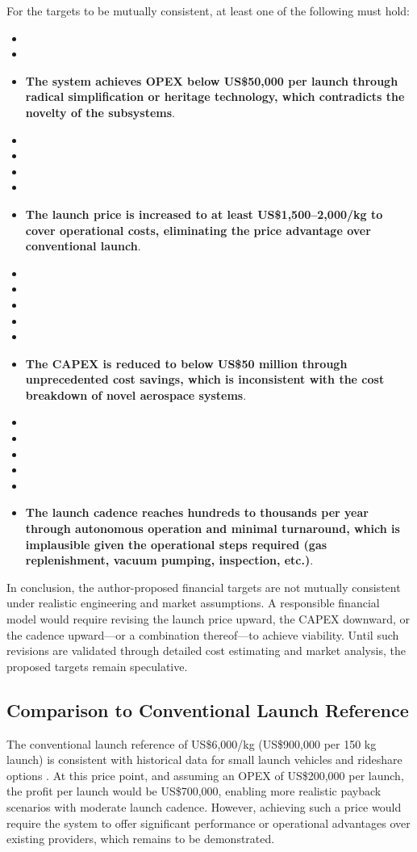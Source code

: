 For the targets to be mutually consistent, at least one of the following must hold:
\begin{itemize}
    \item \item \item \textbf{The system achieves OPEX below US\$50,000 per launch through radical simplification or heritage technology, which contradicts the novelty of the subsystems}.
    \item \item \item \item \item \textbf{The launch price is increased to at least US\$1,500–2,000/kg to cover operational costs, eliminating the price advantage over conventional launch}.
    \item \item \item \item \item \item \textbf{The CAPEX is reduced to below US\$50 million through unprecedented cost savings, which is inconsistent with the cost breakdown of novel aerospace systems}.
    \item \item \item \item \item \item \textbf{The launch cadence reaches hundreds to thousands per year through autonomous operation and minimal turnaround, which is implausible given the operational steps required (gas replenishment, vacuum pumping, inspection, etc.)}.
\end{itemize}

In conclusion, the author-proposed financial targets are not mutually consistent under realistic engineering and market assumptions. A responsible financial model would require revising the launch price upward, the CAPEX downward, or the cadence upward—or a combination thereof—to achieve viability. Until such revisions are validated through detailed cost estimating and market analysis, the proposed targets remain speculative.

\subsection{Comparison to Conventional Launch Reference}
The conventional launch reference of US\$6,000/kg (US\$900,000 per 150 kg launch) is consistent with historical data for small launch vehicles and rideshare options \cite{faa_launch_cost_survey}. At this price point, and assuming an OPEX of US\$200,000 per launch, the profit per launch would be US\$700,000, enabling more realistic payback scenarios with moderate launch cadence. However, achieving such a price would require the system to offer significant performance or operational advantages over existing providers, which remains to be demonstrated.

